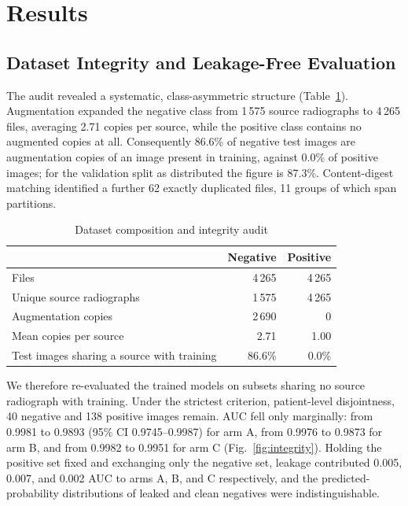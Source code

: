 \documentclass[journal,twoside,web]{ieeecolor}
\begin{document}
\section{Results}
\label{sec:results}

\subsection{Dataset Integrity and Leakage-Free Evaluation}
\label{sec:res-integrity}

The audit revealed a systematic, class-asymmetric structure (Table~\ref{tab:data}). Augmentation expanded the negative class from 1\,575 source radiographs to 4\,265 files, averaging 2.71 copies per source, while the positive class contains no augmented copies at all. Consequently 86.6\% of negative test images are augmentation copies of an image present in training, against 0.0\% of positive images; for the validation split as distributed the figure is 87.3\%. Content-digest matching identified a further 62 exactly duplicated files, 11 groups of which span partitions.

\begin{table}[!t]
\caption{Dataset composition and integrity audit}
\label{tab:data}
\centering
\small
\begin{tabular}{@{}lrr@{}}
\toprule
& \textbf{Negative} & \textbf{Positive} \\
\midrule
Files & 4\,265 & 4\,265 \\
Unique source radiographs & 1\,575 & 4\,265 \\
Augmentation copies & 2\,690 & 0 \\
Mean copies per source & 2.71 & 1.00 \\
Test images sharing a source with training & 86.6\% & 0.0\% \\
\bottomrule
\end{tabular}
\end{table}

We therefore re-evaluated the trained models on subsets sharing no source radiograph with training. Under the strictest criterion, patient-level disjointness, 40 negative and 138 positive images remain. AUC fell only marginally: from 0.9981 to 0.9893 (95\% CI 0.9745--0.9987) for arm A, from 0.9976 to 0.9873 for arm B, and from 0.9982 to 0.9951 for arm C (Fig.~\ref{fig:integrity}). Holding the positive set fixed and exchanging only the negative set, leakage contributed 0.005, 0.007, and 0.002 AUC to arms A, B, and C respectively, and the predicted-probability distributions of leaked and clean negatives were indistinguishable.
\end{document}
